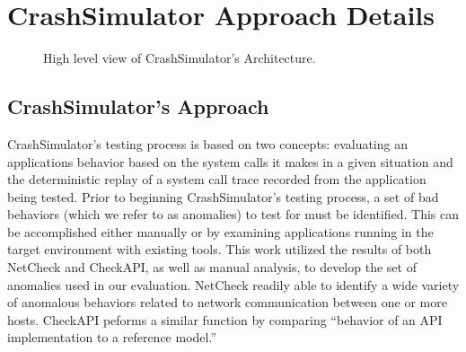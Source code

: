 \section{CrashSimulator Approach Details}
    \begin{figure}[t]
        \center{}
        \caption{High level view of CrashSimulator's Architecture.}
        \label{figure:architecture}
    \end{figure}

    \subsection{CrashSimulator's Approach}
    
    CrashSimulator's testing process is based on two concepts: evaluating an
    applications behavior based on the system calls it makes in a given
    situation and the deterministic replay of a system call trace recorded from
    the application being tested.  Prior to beginning CrashSimulator's testing
    process, a set of bad behaviors (which we refer to as anomalies) to test for
    must be identified.  This can be accomplished either manually or by
    examining applications running in the target environment with existing
    tools.  This work utilized the results of both
    NetCheck\cite{Zhuang_NSDI_2014} and CheckAPI\cite{rasley2015detecting}, as
    well as manual analysis, to develop the set of anomalies used in our
    evaluation.  NetCheck readily able to identify a wide variety of anomalous
    behaviors related to network communication between one or more
    hosts. CheckAPI peforms a similar function by comparing ``behavior of an API
    implementation to a reference model.''

